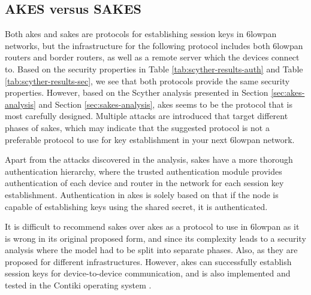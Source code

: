 \subsection{AKES versus SAKES}

Both \gls{akes} and \gls{sakes} are protocols for establishing session keys in \gls{6lowpan} networks, but the infrastructure for the following protocol includes both \gls{6lowpan} routers and border routers, as well as a remote server which the devices connect to. Based on the security properties in Table \ref{tab:scyther-results-auth} and Table \ref{tab:scyther-results-sec}, we see that both protocols provide the same security properties. However, based on the Scyther analysis presented in Section \ref{sec:akes-analysis} and Section \ref{sec:sakes-analysis}, \gls{akes} seems to be the protocol that is most carefully designed. Multiple attacks are introduced that target different phases of \gls{sakes}, which may indicate that the suggested protocol is not a preferable protocol to use for key establishment in your next \gls{6lowpan} network.

Apart from the attacks discovered in the analysis, \gls{sakes} have a more thorough authentication hierarchy, where the trusted authentication module provides authentication of each device and router in the network for each session key establishment. Authentication in \gls{akes} is solely based on that if the node is capable of establishing keys using the shared secret, it is authenticated.

It is difficult to recommend \gls{sakes} over \gls{akes} as a protocol to use in \gls{6lowpan} as it is wrong in its original proposed form, and since its complexity leads to a security analysis where the model had to be split into separate phases. Also, as they are proposed for different infrastructures. However, \gls{akes} can successfully establish session keys for device-to-device communication, and is also implemented and tested in the Contiki operating system \cite{krentz2015handling}.



